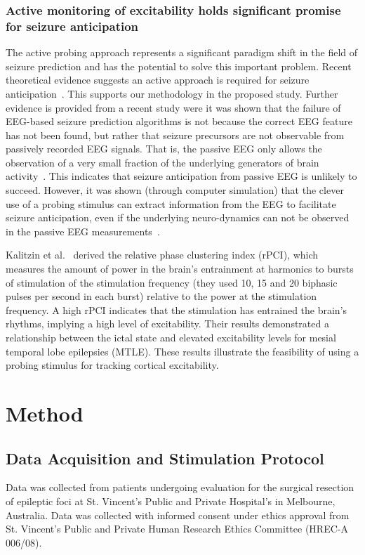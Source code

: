 \documentclass[]{article}
\begin{document}
\subsubsection{Active monitoring of excitability holds significant promise for seizure anticipation}
The active probing approach represents a significant paradigm shift in the field of seizure prediction and has the potential to solve this important problem. Recent theoretical evidence suggests an active approach is required for seizure anticipation~\cite{Suffczynski2008}. This supports our methodology in the proposed study. Further evidence is provided from a recent study were it was shown that the failure of EEG-based seizure prediction algorithms is not because the correct EEG feature has not been found, but rather that seizure precursors are not observable from passively recorded EEG signals. That is, the passive EEG only allows the observation of a very small fraction of the underlying generators of brain activity~\cite{O'Sullivan-Greene2009, O'Sullivan-Greene2009a}. This indicates that seizure anticipation from passive EEG is unlikely to succeed. However, it was shown (through computer simulation) that the clever use of a probing stimulus can extract information from the EEG to facilitate seizure anticipation, even if the underlying neuro-dynamics can not be observed in the passive EEG measurements~\cite{O'Sullivan-Greene2009a}. 

Kalitzin et al.~\cite{Kalitzin2005} derived the relative phase clustering index (rPCI), which measures the amount of power in the brain’s entrainment at harmonics to bursts of stimulation  of the stimulation frequency (they used 10, 15 and 20 biphasic pulses per second in each burst) relative to the power at the stimulation frequency. A high rPCI indicates that the stimulation has entrained the brain’s rhythms, implying a high level of excitability. Their results demonstrated a relationship between the ictal state and elevated excitability levels for mesial temporal lobe epilepsies (MTLE). These results illustrate the feasibility of using a probing stimulus for tracking cortical excitability.

\section{Method}
\subsection{Data Acquisition and Stimulation Protocol}
Data was collected from patients undergoing evaluation for the surgical resection of epileptic foci at St. Vincent's Public and Private Hospital's in Melbourne, Australia. Data was collected with informed consent under ethics approval from St. Vincent's Public and Private Human Research Ethics Committee (HREC-A 006/08).
\end{document}
